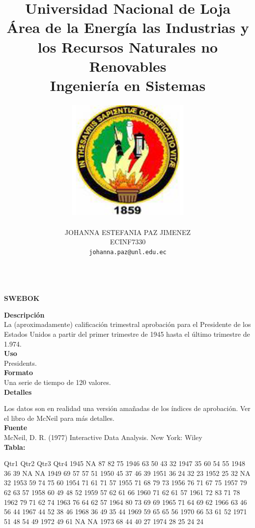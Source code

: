 \documentclass[10pt]{report}
\title{\Huge Universidad Nacional de Loja \\ 
Área de la Energía las Industrias y los Recursos Naturales no Renovables \\
Ingeniería en Sistemas \\}
\author{\includegraphics[width=6cm, height=6cm]{unloja.png}\\\\   
  JOHANNA ESTEFANIA PAZ JIMENEZ \\ ECINF7330\\  \texttt{johanna.paz@unl.edu.ec}\\ \\
}
\begin{document}

\maketitle
\begin{center}\textbf{\Large SWEBOK}\end{center}

\textbf{Descripción}\\

La (aproximadamente) calificación trimestral aprobación para el Presidente de los Estados Unidos a partir del primer trimestre de 1945 hasta el último trimestre de 1.974.\\

\textbf{Uso}\\

Presidents.\\

\textbf{Formato}\\

Una serie de tiempo de 120 valores.\\


\textbf{Detalles}

Los datos son en realidad una versión amañadas de los índices de aprobación. Ver el libro de McNeil para más detalles.\\

\textbf{Fuente}\\

McNeil, D. R. (1977) Interactive Data Analysis. New York: Wiley\\


\textbf{Tabla:}\\
\begin{Schunk}
\begin{Soutput}
     Qtr1 Qtr2 Qtr3 Qtr4
1945   NA   87   82   75
1946   63   50   43   32
1947   35   60   54   55
1948   36   39   NA   NA
1949   69   57   57   51
1950   45   37   46   39
1951   36   24   32   23
1952   25   32   NA   32
1953   59   74   75   60
1954   71   61   71   57
1955   71   68   79   73
1956   76   71   67   75
1957   79   62   63   57
1958   60   49   48   52
1959   57   62   61   66
1960   71   62   61   57
1961   72   83   71   78
1962   79   71   62   74
1963   76   64   62   57
1964   80   73   69   69
1965   71   64   69   62
1966   63   46   56   44
1967   44   52   38   46
1968   36   49   35   44
1969   59   65   65   56
1970   66   53   61   52
1971   51   48   54   49
1972   49   61   NA   NA
1973   68   44   40   27
1974   28   25   24   24
\end{Soutput}
\end{Schunk}
\end{document}
